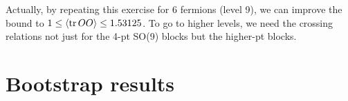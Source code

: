 \documentclass[11pt]{article}
\renewcommand{\ev}[1]{\langle #1 \rangle} %
\begin{document}
Actually, by repeating this exercise for 6 fermions (level 9), we can improve the bound to $1 \le \ev{\tr OO} \le 1.53125 $. To go to higher levels, we need the crossing relations not just for the 4-pt SO(9) blocks but the higher-pt blocks.
























\color{black}



\section{Bootstrap results}
\end{document}
